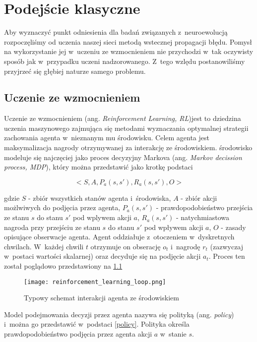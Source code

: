 \chapter{Podejście klasyczne}

Aby wyznaczyć punkt odniesienia dla badań związanych z~neuroewolucją rozpoczęliśmy od uczenia naszej sieci metodą wstecznej propagacji błędu. Pomysł na wykorzystanie jej w~uczeniu ze wzmocnieniem nie przychodzi w~tak oczywisty sposób jak w~przypadku uczeni nadzorowanego. Z~tego wzlędu postanowiliśmy przyjrzeć się głębiej naturze samego problemu.

\section*{Uczenie ze wzmocnieniem}

Uczenie ze wzmocnieniem (ang. \textit{Reinforcement Learning, RL})jest to dziedzina uczenia maszynowego zajmująca się metodami wyznaczania optymalnej strategii zachowania agenta w~nieznanym mu środowisku. Celem agenta jest maksymalizacja nagrody otrzymywanej za interakcję ze środowiskiem. środowisko modeluje się najczęciej jako proces decyzyjny Markova (ang. \textit{Markov decission process, MDP}), który można przedstawić jako krotkę podstaci

\begin{equation}
    <S,A,P_a(s, s'),R_a(s, s'),O>
\end{equation}

gdzie $S$ - zbiór wszystkich stanów agenta i~środowiska, $A$ - zbiór akcji możlwiwych do podjęcia przez agenta, $P_a(s, s')$ - prawdopodobieństwo przejścia ze stanu $s$ do stanu $s'$ pod wplywem akcji $a$, $R_a(s, s')$ - natychmiastowa nagroda przy przejściu ze stanu $s$ do stanu $s'$ pod wpływem akcji $a$, $O$ -  zasady opisujące obserwacje agenta. Agent oddziałuje z~otoczeniem w~dyskretnych chwilach. W~każdej chwili $t$ otrzymuje on obserację $o_t$ i~nagrodę $r_t$ (zazwyczaj w~postaci wartości skalarnej) oraz decyduje się na podjęcie akcji $a_t$. Proces ten został poglądowo przedstawiony na \figurename\ref{reinforcement-learning}

\vskip 0.5cm
\begin{figure}[h]
    \centering
    \texttt{[image: reinforcement\_learning\_loop.png]}
    \caption{Typowy schemat interakcji agenta ze środowiskiem}
    \label{reinforcement-learning}
\end{figure}
\vskip 0.5cm

Model podejmowania decyzji przez agenta nazywa się polityką (ang. \textit{policy}) i~można go przedstawić w~podstaci \ref{policy}. Polityka określa prawdopodobieństwo podjęcia przez agenta akcji $a$ w~stanie $s$.

